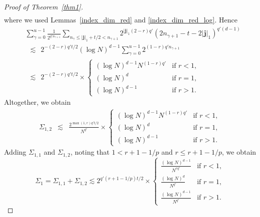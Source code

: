 \documentclass[12pt, a4paper]{article}
\newcommand{\nicolas}[1]{\begingroup\color{teal}#1\endgroup}
\newcommand{\bsj}{{\boldsymbol{j}}}
\begin{document}
\begin{proof}[Proof of Theorem~\ref{thm1}]
\begin{eqnarray*}
\end{eqnarray*}
where we used Lemmas~\ref{index_dim_red} and \ref{index_dim_red_log}. Hence%
\begin{align*}
    & \sum_{\gamma=0}^{u-1} \frac{1}{2^{q' n_{\gamma+1}}} \sum_{n_{\gamma} \le |\bsj|_1+t/2 < n_{\gamma+1}}  2^{|\bsj|_1 (2-r) q'} (2n_{\gamma+1} - t - 2|\bsj|_1)^{q'(d-1)}\\
    & ~~ \lesssim ~~ 2^{-(2-r)q' t/2} (\log N)^{d-1}  \sum_{\gamma=0}^{u-1} 2^{(1-r)q'n_{\gamma+1}}\\
    & ~~ \lesssim ~~ 2^{-(2-r)q' t/2} \times \left\{
\begin{array}{ll}
(\log N)^{d-1} N^{(1-r) q'} & \mbox{if } r<1,\\
(\log N)^d & \mbox{if } r=1,\\
(\log N)^{d-1} & \mbox{if } r>1.
\end{array}\right. 
\end{align*}
Altogether, we obtain 
\begin{eqnarray*}
\Sigma_{1,2} & \lesssim & \frac{2^{\max(1, r) q' t/2}}{N^{q'}} \times \left\{
\begin{array}{ll}
(\log N)^{d-1} N^{(1-r) q'} & \mbox{if } r < 1,\\
(\log N)^d & \mbox{if } r=1,\\
(\log N)^{d-1} & \mbox{if } r>1.
\end{array}\right. 
\end{eqnarray*}
Adding $\Sigma_{1,1}$ and $\Sigma_{1,2}$, noting that $1 < r+1-1/p$ and $r \leq r+1-1/p$, we obtain
\begin{equation}\label{est:S1}
\Sigma_1 =\Sigma_{1,1}+\Sigma_{1,2} \lesssim 2^{q'(r+1-1/p)t/2} \times \left\{ 
\begin{array}{ll}
\frac{(\log N)^{d-1}}{N^{rq'}} & \mbox{if } r < 1,\\[0.5em]
\frac{(\log N)^d}{N^{q'}} & \mbox{if } r=1,\\[0.5em]
\frac{(\log N)^{d-1}}{N^{q'}} & \mbox{if } r>1.
\end{array}\right. 
\end{equation}


\end{proof}
\end{document}
